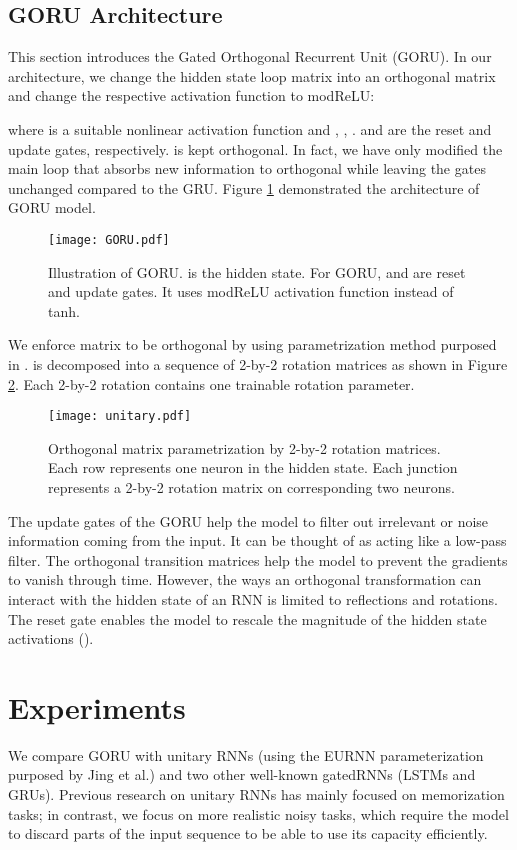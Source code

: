 \documentclass[letterpaper]{article} \usepackage{aaai18}  \usepackage{times}  \usepackage{helvet}  \usepackage{courier}  \usepackage{url}  \usepackage{graphicx}
\begin{document}
\subsection{GORU Architecture}

This section introduces the Gated Orthogonal Recurrent Unit (GORU). In our architecture, we change the hidden state loop matrix into an orthogonal matrix and change the respective activation function to modReLU:

where  is a suitable nonlinear activation function and 
, , . 
 and  are the reset and update gates, respectively.  is kept orthogonal. In fact, we have only modified the main loop that absorbs new information to orthogonal while leaving the gates unchanged compared to the GRU. Figure \ref{fig:goru} demonstrated the architecture of GORU model.
\begin{figure}[h!]
\centering
\texttt{[image: GORU.pdf]}
\caption{Illustration of GORU.  is the hidden state. For GORU,  and  are reset and update gates. It uses modReLU activation function instead of tanh.}
\label{fig:goru}
\end{figure}  


We enforce matrix  to be orthogonal by using parametrization method purposed in \cite{jing2016tunable}.  is decomposed into a sequence of 2-by-2 rotation matrices as shown in Figure \ref{fig:unitary}. Each 2-by-2 rotation contains one trainable rotation parameter.
\begin{figure}[h!]
\centering
\texttt{[image: unitary.pdf]}
\caption{Orthogonal matrix parametrization by 2-by-2 rotation matrices. Each row represents one neuron in the hidden state. Each junction represents a 2-by-2 rotation matrix on corresponding two neurons.}
\label{fig:unitary}
\end{figure}  

The update gates of the GORU help the model to filter out irrelevant or noise information coming from the input. It can be thought of as acting like a low-pass filter. The orthogonal transition matrices help the model to prevent the gradients to vanish through time. However, the ways an orthogonal transformation can interact with the hidden state of an RNN is limited to reflections and rotations. The reset gate enables the model to rescale the magnitude of the hidden state activations ().




\section{Experiments}
We compare GORU with unitary RNNs (using the EURNN parameterization purposed by Jing et al.\cite{jing2016tunable}) and two other well-known gatedRNNs (LSTMs and GRUs). Previous research on unitary RNNs has mainly focused on memorization tasks; in contrast, we focus on more realistic noisy tasks, which require the model to discard parts of the input sequence to be able to use its capacity efficiently. 
\end{document}
